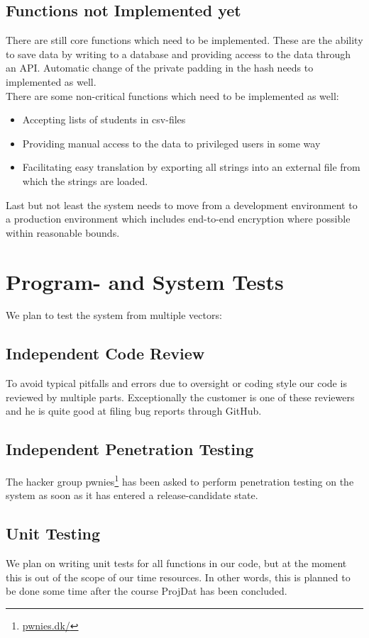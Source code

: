 \documentclass[11pt,a4paper]{report}
\begin{document}
\subsection{Functions not Implemented yet}
There are still core functions which need to be implemented. These are the ability to save data by writing to a database and providing access to the data through an API. Automatic change of the private padding in the hash needs to implemented as well. \\
There are some non-critical functions which need to be implemented as well:
\begin{itemize}
    \item Accepting lists of students in csv-files
    \item Providing manual access to the data to privileged users in some way
    \item Facilitating easy translation by exporting all strings into an external file from which the strings are loaded.
\end{itemize}
Last but not least the system needs to move from a development environment to a production environment which includes end-to-end encryption where possible within reasonable bounds.

\section{Program- and System Tests}\label{sec:Program_systemtests}
We plan to test the system from multiple vectors:
\subsection{Independent Code Review}
To avoid typical pitfalls and errors due to oversight or coding style our code is reviewed by multiple parts. Exceptionally the customer is one of these reviewers and he is quite good at filing bug reports through GitHub.
\subsection{Independent Penetration Testing}
The hacker group pwnies\footnote{\href{https://pwnies.dk/}{pwnies.dk/}} has been asked to perform penetration testing on the system as soon as it has entered a release-candidate state.
\subsection{Unit Testing}
We plan on writing unit tests for all functions in our code, but at the moment this is out of the scope of our time resources. In other words, this is planned to be done some time after the course ProjDat has been concluded.
\newpage
\end{document}

